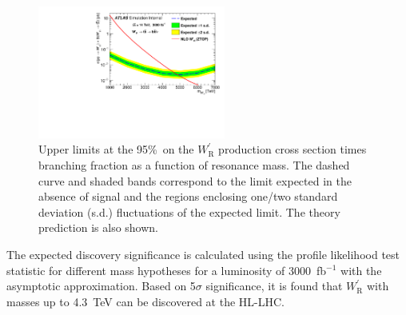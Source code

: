 \begin{figure}[t]
  \centering
  \includegraphics[width=0.55\textwidth]{./section7OtherSignatures/img/Wptb_expected_limit_14TeV.pdf}
  \caption{Upper limits at the 95\%~\cl on the $W^\prime_{\mathrm{R}}$ production cross section times
    branching fraction as a function of resonance mass. The dashed curve and shaded bands correspond
    to the limit expected in the absence of signal and the regions enclosing one/two standard deviation
    (s.d.) fluctuations of the expected limit. The theory prediction is also shown. 
}
\label{fig:ATLAS_wpLimit}
\end{figure}

The expected discovery significance is calculated using the profile likelihood test statistic for
different mass hypotheses for a luminosity of 3000~fb$^{-1}$ with the asymptotic approximation.
Based on 5$\sigma$ significance, it is found that $W^\prime_{\mathrm{R}}$ with masses up to 4.3~TeV
can be discovered at the HL-LHC.

